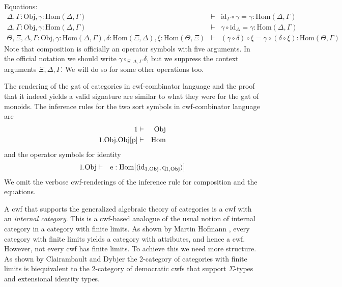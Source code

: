 \documentclass{lmcs}
\def\Obj{\mathrm{Obj}}
\def\Ctx{\mathrm{Ctx}}
\def\Hom{\mathrm{Hom}}
\def\id{\mathrm{id}}
\def\idmon{\mathrm{e}}
\begin{document}
Equations:
\begin{eqnarray*}
\Delta, \Gamma : \Obj, \gamma : \Hom(\Delta,\Gamma) &\vdash& \id_\Gamma \circ \gamma = \gamma : \Hom(\Delta,\Gamma)\\
\Delta, \Gamma : \Obj, \gamma : \Hom(\Delta,\Gamma) &\vdash& \gamma \circ \id_\Delta = \gamma : \Hom(\Delta,\Gamma)\\
\Theta, \Xi,\Delta,\Gamma : \Obj, \gamma : \Hom(\Delta,\Gamma), \delta : \Hom(\Xi,\Delta), \xi : \Hom(\Theta,\Xi) &\vdash&
(\gamma \circ \delta) \circ \xi = \gamma \circ (\delta \circ \xi): \Hom(\Theta,\Gamma)
\end{eqnarray*}
Note that composition is officially an operator symbols with five arguments. In the official notation we should write $\gamma \circ_{\Xi,\Delta,\Gamma} \delta$, but we suppress the context arguments $\Xi,\Delta,\Gamma$. We will do so for some other operations too.

The rendering of the gat of categories in cwf-combinator language and the proof that it indeed yields a valid signature are similar to what they were for the gat of monoids. The inference rules for the two sort symbols in cwf-combinator language are
\begin{eqnarray*}
1 &\vdash& \Obj\\
1.\Obj.\Obj[\p] &\vdash& \Hom
\end{eqnarray*}
and the operator symbols for identity
\begin{eqnarray*}
1.\Obj &\vdash& \idmon : \Hom[\tuple{\id_{1.\Obj},\q_{1,\Obj}}]
\end{eqnarray*}
We omit the verbose cwf-renderings of the inference rule for composition and the equations.

A cwf that supports the generalized algebraic theory of categories is a cwf with an {\em internal category}. This is a cwf-based analogue of the usual notion of internal category in a category with finite limits. As shown by Martin Hofmann \cite{hofmann:csl,hofmann:cambridge}, every category with finite limits yields a category with attributes, and hence a cwf. However, not every cwf has finite limits. To achieve this we need more structure. As shown by Clairambault and Dybjer \cite{ClairambaultD11,ClairambaultD14} the 2-category of categories with finite limits is biequivalent to the 2-category of democratic cwfs that support $\Sigma$-types and extensional identity types.
\end{document}
